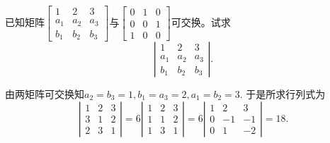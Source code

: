 \begin{frame}
  \begin{li}[$\bigstar$]
    已知矩阵$\left[
    \begin{array}{ccc}
      1&2&3\\
      a_1&a_2&a_3\\
      b_1&b_2&b_3
    \end{array}\right]
    $与$\left[
    \begin{array}{ccc}
      0&1&0\\
      0&0&1\\
      1&0&0
    \end{array}\right]
    $可交换。试求$$
    \left|
    \begin{array}{ccc}
      1&2&3\\
      a_1&a_2&a_3\\
      b_1&b_2&b_3
    \end{array}
    \right|.
    $$
  \end{li}
  \pause
  \begin{jie}
    由两矩阵可交换知$a_2=b_3=1, b_1=a_3=2, a_1=b_2=3$. 于是所求行列式为
    $$
    \left|
    \begin{array}{ccc}
      1&2&3\\
      3&1&2\\
      2&3&1
    \end{array}
    \right|=6\left|
    \begin{array}{ccc}
      1&2&3\\
      1&1&2\\
      1&3&1
    \end{array}
    \right|=6\left|
    \begin{array}{ccc}
      1&2&3\\
      0&-1&-1\\
      0&1&-2
    \end{array}
    \right|=18.
    $$
    
  \end{jie}
\end{frame}

